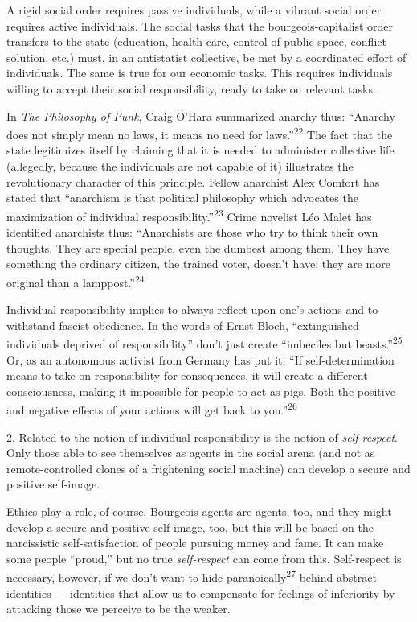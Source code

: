 A rigid social order requires passive individuals, while a vibrant social order
requires active individuals. The social tasks that the bourgeois-capitalist
order transfers to the state (education, health care, control of public space,
conflict solution, etc.) must, in an antistatist collective, be met by a
coordinated effort of individuals. The same is true for our economic tasks. This
requires individuals willing to accept their social responsibility, ready to
take on relevant tasks.

In \textit{The Philosophy of Punk}, Craig O’Hara summarized anarchy thus:
“Anarchy does not simply mean no laws, it means no need for
laws.”\textsuperscript{22} The fact that the state legitimizes itself by
claiming that it is needed to administer collective life (allegedly, because the
individuals are not capable of it) illustrates the revolutionary character of
this principle. Fellow anarchist Alex Comfort has stated that “anarchism is that
political philosophy which advocates the maximization of individual
responsibility.”\textsuperscript{23} Crime novelist Léo Malet has identified
anarchists thus: “Anarchists are those who try to think their own thoughts. They
are special people, even the dumbest among them. They have something the
ordinary citizen, the trained voter, doesn’t have: they are more original than
a lamppost.”\textsuperscript{24}

Individual responsibility implies to always reflect upon one’s actions and to
withstand fascist obedience. In the words of Ernst Bloch, “extinguished
individuals deprived of responsibility” don’t just create “imbeciles but
beasts.”\textsuperscript{25} Or, as an autonomous activist from Germany has put
it: “If self-determination means to take on responsibility for consequences, it
will create a different consciousness, making it impossible for people to act as
pigs. Both the positive and negative effects of your actions will get back to
you.”\textsuperscript{26}

2. Related to the notion of individual responsibility is the notion of
\textit{self-respect}. Only those able to see themselves as agents in the social
arena (and not as remote-controlled clones of a frightening social machine) can
develop a secure and positive self-image.

Ethics play a role, of course. Bourgeois agents are agents, too, and they might
develop a secure and positive self-image, too, but this will be based on the
narcissistic self-satisfaction of people pursuing money and fame. It can make
some people “proud,” but no true \textit{self-respect} can come from this.
Self-respect is necessary, however, if we don’t want to hide
paranoically\textsuperscript{27} behind abstract identities — identities that
allow us to compensate for feelings of inferiority by attacking those we
perceive to be the weaker.

